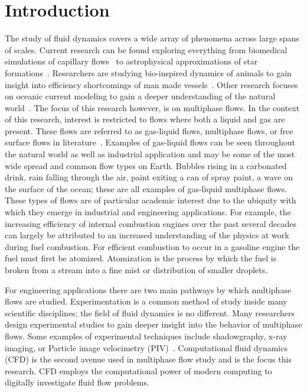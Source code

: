 \chapter{Introduction}\label{CH:introduction}


The study of fluid dynamics covers a wide array of phenomena across large spans of scales. Current research can be found exploring everything from biomedical simulations of capillary flows~\cite{biomed} to astrophysical approximations of star formations~\cite{star}. Researchers are studying bio-inspired dynamics of animals to gain insight into efficiency shortcomings of man made vessels~\cite{fish}. Other research focuses on oceanic current modeling to gain a deeper understanding of the natural world~\cite{ocean}. The focus of this research however, is on multiphase flows. In the context of this research, interest is restricted to flows where both a liquid and gas are present. These flows are referred to as gas-liquid flows, multiphase flows, or free surface flows in literature~\cite{gasliq,freesurf,brian}. Examples of gas-liquid flows can be seen throughout the natural world as well as industrial application and may be some of the most wide spread and common flow types on Earth. Bubbles rising in a carbonated drink, rain falling through the air, paint exiting a can of spray paint, a wave on the surface of the ocean; these are all examples of gas-liquid multiphase flows. These types of flows are of particular academic interest due to the ubiquity with which they emerge in industrial and engineering applications. For example, the increasing efficiency of internal combustion engines over the past several decades can largely be attributed to an increased understanding of the physics at work during fuel combustion. For efficient combustion to occur in a gasoline engine the fuel must first be atomized. Atomization is the process by which the fuel is broken from a stream into a fine mist or distribution of smaller droplets.


For engineering applications there are two main pathways by which multiphase flows are studied. Experimentation is a common method of study inside many scientific disciplines; the field of fluid dynamics is no different. Many researchers design experimental studies to gain deeper insight into the behavior of multiphase flows. Some examples of experimental techniques include shadowgraphy, x-ray imaging, or Particle image velocimetry (PIV)~\cite{shadow,piv,xray}. Computational fluid dynamics (CFD) is the second avenue used in multiphase flow study and is the focus this research.  CFD employs the computational power of modern computing to digitally investigate fluid flow problems. 



